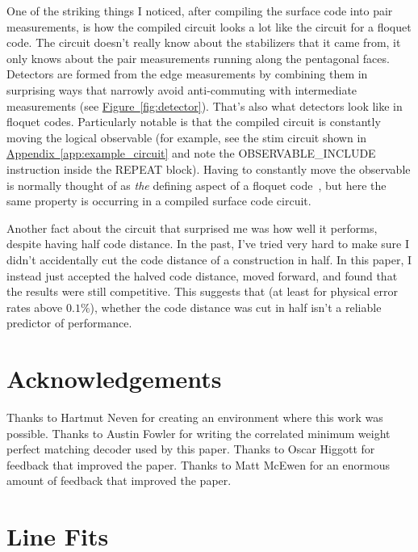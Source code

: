 \documentclass[onecolumn,unpublished,a4paper]{quantumarticle}
\theoremstyle{definition}
\theoremstyle{definition}
\theoremstyle{definition}
\DeclareRobustCommand{\app}[1]{\hyperref[app:#1]{Appendix~\ref*{app:#1}}}
\newcommand{\fig}[1]{\hyperref[fig:#1]{Figure~\ref*{fig:#1}}}
\begin{document}
One of the striking things I noticed, after compiling the surface code into pair measurements, is how the compiled circuit looks a lot like the circuit for a floquet code.
The circuit doesn't really know about the stabilizers that it came from, it only knows about the pair measurements running along the pentagonal faces.
Detectors are formed from the edge measurements by combining them in surprising ways that narrowly avoid anti-commuting with intermediate measurements (see \fig{detector}).
That's also what detectors look like in floquet codes.
Particularly notable is that the compiled circuit is constantly moving the logical observable (for example, see the stim circuit shown in \app{example_circuit} and note the OBSERVABLE\_INCLUDE instruction inside the REPEAT block).
Having to constantly move the observable is normally thought of as \emph{the} defining aspect of a floquet code~\cite{hastings2021dynamically}, but here the same property is occurring in a compiled surface code circuit.

Another fact about the circuit that surprised me was how well it performs, despite having half code distance.
In the past, I've tried very hard to make sure I didn't accidentally cut the code distance of a construction in half.
In this paper, I instead just accepted the halved code distance, moved forward, and found that the results were still competitive.
This suggests that (at least for physical error rates above $0.1\%$), whether the code distance was cut in half isn't a reliable predictor of performance.

\section{Acknowledgements}

Thanks to Hartmut Neven for creating an environment where this work was possible.
Thanks to Austin Fowler for writing the correlated minimum weight perfect matching decoder used by this paper.
Thanks to Oscar Higgott for feedback that improved the paper.
Thanks to Matt McEwen for an enormous amount of feedback that improved the paper.





\appendix
\clearpage

\section{Line Fits}
\label{app:uncertainty}
\end{document}
